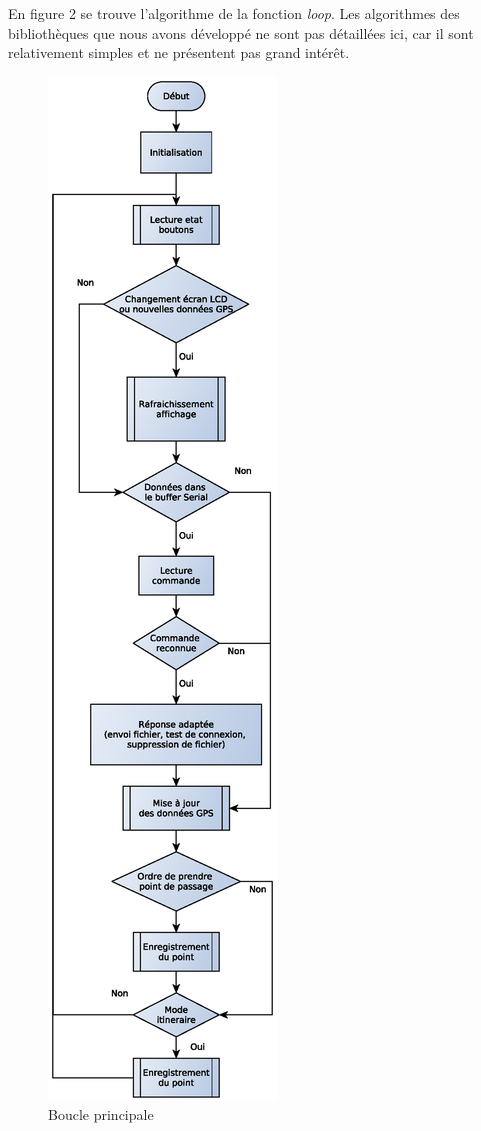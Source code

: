 \documentclass[a4paper,12pt]{article}
\begin{document}
En figure 2 se trouve l'algorithme de la fonction \textit{loop}. Les algorithmes des bibliothèques que nous avons développé ne sont pas détaillées ici, car il sont relativement simples et ne présentent pas grand intérêt.
\newpage
\begin{figure}[!ht]
	\begin{center}
		
		\includegraphics[scale = 0.5]{MainAlgoGraph.eps}
		\caption{Boucle principale}
	\end{center}
\end{figure}
\FloatBarrier
\end{document}

